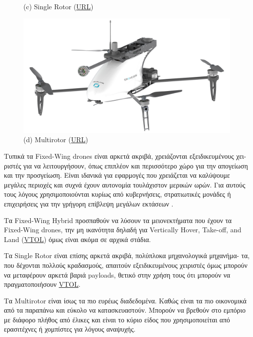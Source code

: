 \begin{figure} [H]
\begin{minipage}{.5\textwidth}
        {(c) Single Rotor} (\href{https://www.prodrone.com/release-en/2874/}{URL})
      \end{minipage}%
      \begin{minipage}{.5\textwidth}
        \centering
        \includegraphics[width=\linewidth]{Images/Introduction/uav-multirotor-example.jpg}
        {(d) Multirotor} (\href{https://metatronus.com/heliplane/}{URL})
      \end{minipage}
    \hfill \break
    \decoRule
    \caption[UAV Examples]{}
    \label{fig:UAV-samples}
\end{figure}

Τυπικά τα Fixed-Wing drones είναι αρκετά ακριβά, χρειάζονται εξειδικευμένους χει- ριστές για να
λειτουργήσουν, όπως επιπλέον και περισσότερο χώρο για την απογείωση και την προσγείωση. Είναι 
ιδανικά για εφαρμογές που χρειάζεται να καλύψουμε μεγάλες περιοχές και συχνά έχουν αυτονομία 
τουλάχιστον μερικών ωρών. Για αυτούς τους λόγους χρησιμοποιούνται κυρίως από κυβερνήσεις,
στρατιωτικές μονάδες ή επιχειρήσεις για την γρήγορη επίβλεψη μεγάλων εκτάσεων \cite{fixed-wing}.  

Τα Fixed-Wing Hybrid προσπαθούν να λύσουν τα μειονεκτήματα που έχουν τα Fixed-Wing drones, την μη ικανότητα 
δηλαδή για  Vertically Hover, Take-off, and Land (\hyperref[abbr:VTOL]{VTOL}) όμως είναι ακόμα σε αρχικά στάδια.

Τα Single Rotor είναι επίσης αρκετά ακριβά, πολύπλοκα μηχανολογικά μηχανήμα- τα, που δέχονται πολλούς κραδασμούς, 
απαιτούν εξειδικευμένους χειριστές όμως μπορούν να μεταφέρουν αρκετά βαριά payloads, θετικό στην χρήση τους ότι 
μπορούν να πραγματοποιήσουν \hyperref[abbr:VTOL]{VTOL}.

Τα Multirotor είναι ίσως τα πιο ευρέως διαδεδομένα. Καθώς είναι τα πιο οικονομικά από τα παραπάνω και εύκολο να κατασκευαστούν.
Μπορούν να βρεθούν στο εμπόριο με διάφορο πλήθος από έλικες και είναι το κύριο είδος που χρησιμοποιείται από ερασιτέχνες
ή χομπίστες για λόγους αναψυχής.

